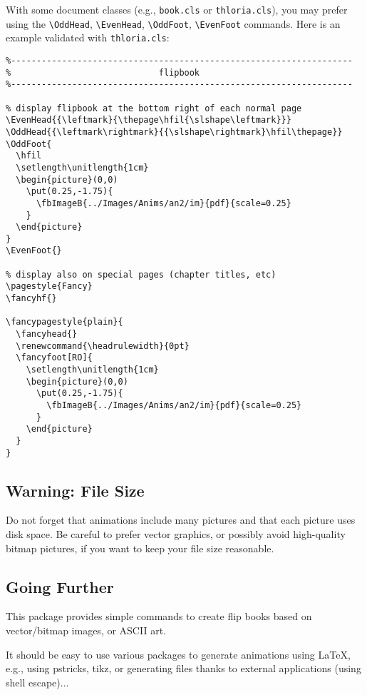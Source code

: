 \documentclass[a4paper,twoside]{article}
\begin{document}
With some document classes (e.g., \verb+book.cls+ or
\verb+thloria.cls+), you may prefer using the \verb+\OddHead+,
\verb+\EvenHead+, \verb+\OddFoot+, \verb+\EvenFoot+ commands. Here is
an example validated with \verb+thloria.cls+:
\begin{verbatim}
%-------------------------------------------------------------------
%                             flipbook
%-------------------------------------------------------------------

% display flipbook at the bottom right of each normal page
\EvenHead{{\leftmark}{\thepage\hfil{\slshape\leftmark}}}
\OddHead{{\leftmark\rightmark}{{\slshape\rightmark}\hfil\thepage}}
\OddFoot{
  \hfil
  \setlength\unitlength{1cm}
  \begin{picture}(0,0)
    \put(0.25,-1.75){
      \fbImageB{../Images/Anims/an2/im}{pdf}{scale=0.25}
    }
  \end{picture}
}
\EvenFoot{}

% display also on special pages (chapter titles, etc)
\pagestyle{Fancy}
\fancyhf{}

\fancypagestyle{plain}{
  \fancyhead{}
  \renewcommand{\headrulewidth}{0pt}
  \fancyfoot[RO]{
    \setlength\unitlength{1cm}
    \begin{picture}(0,0)
      \put(0.25,-1.75){
        \fbImageB{../Images/Anims/an2/im}{pdf}{scale=0.25}
      }
    \end{picture}
  }
} 
\end{verbatim}

\subsection{Warning: File Size}

Do not forget that animations include many pictures and that each
picture uses disk space. Be careful to prefer vector graphics, or
possibly avoid high-quality bitmap pictures, if you want to keep your
file size reasonable.

\subsection{Going Further}

This package provides simple commands to create flip books based on
vector/bitmap images, or ASCII art.

It should be easy to use various packages to generate animations using
\LaTeX{}, e.g., using pstricks, tikz, or generating files thanks to
external applications (using shell escape)...
\end{document}
